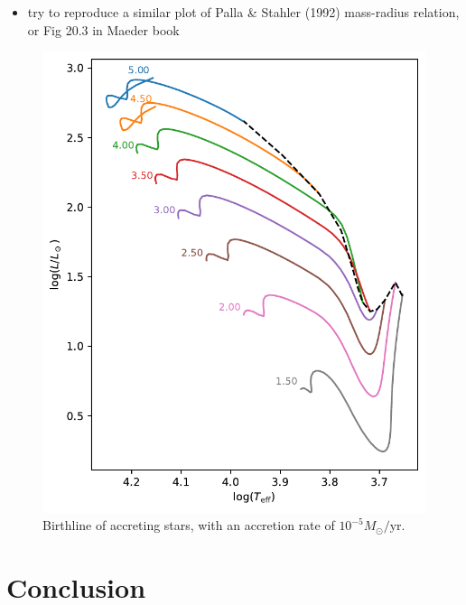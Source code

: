 \documentclass[12pt,a4paper]{article}
\newcommand{\mr}{\mathrm}
\newenvironment{outline}[1]{%
  \begin{itemize}[label=\textbullet]%
  \color{#1}%
}{%
  \end{itemize}%
}
\begin{document}
\begin{outline}{gray}
  \item try to reproduce a similar plot of Palla \& Stahler (1992) mass-radius relation, or Fig 20.3 in Maeder book
\end{outline}

\begin{figure}
  \centering  
  \includegraphics[width=.5\textwidth,keepaspectratio]{birthline_acce5.pdf}
  \caption{Birthline of accreting stars, with an accretion rate of $10^{-5} M_\odot/\mr{yr}$.} \label{fig:birthline_acce5}
\end{figure}




\section{Conclusion}
\label{sec:conclusion}
\end{document}
